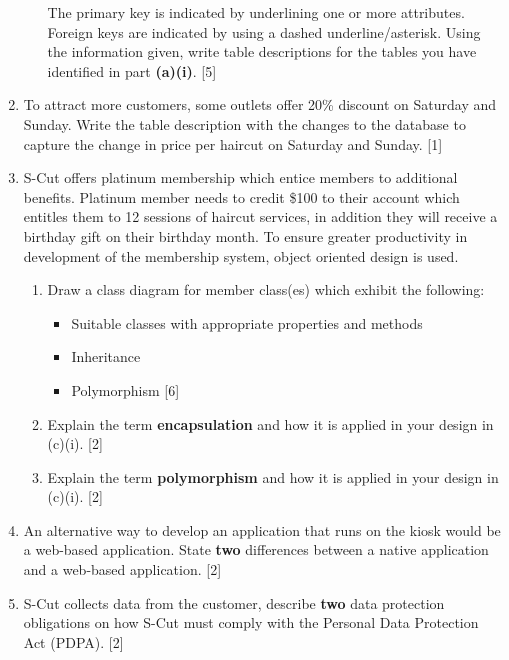 \begin{enumerate}
\begin{enumerate}
The primary key is indicated by underlining one or more attributes.
Foreign keys are indicated by using a dashed underline/asterisk. Using
the information given, write table descriptions for the tables you
have identified in part \textbf{(a)(i)}. \hfill{}{[}5{]}
\end{enumerate}
\item To attract more customers, some outlets offer 20\% discount on Saturday
and Sunday. Write the table description with the changes to the database
to capture the change in price per haircut on Saturday and Sunday.
\hfill{}{[}1{]}
\item S-Cut offers platinum membership which entice members to additional
benefits. Platinum member needs to credit \$100 to their account which
entitles them to 12 sessions of haircut services, in addition they
will receive a birthday gift on their birthday month. To ensure greater
productivity in development of the membership system, object oriented
design is used. 
\begin{enumerate}
\item Draw a class diagram for member class(es) which exhibit the following: 
\begin{itemize}
\item Suitable classes with appropriate properties and methods
\item Inheritance 
\item Polymorphism \hfill{}{[}6{]}
\end{itemize}
\item Explain the term \textbf{encapsulation} and how it is applied in your
design in (c)(i). \hfill{}{[}2{]}
\item Explain the term \textbf{polymorphism} and how it is applied in your
design in (c)(i). \hfill{}{[}2{]}
\end{enumerate}
\item An alternative way to develop an application that runs on the kiosk
would be a web-based application. State \textbf{two} differences between
a native application and a web-based application. \hfill{}{[}2{]}
\item S-Cut collects data from the customer, describe \textbf{two} data
protection obligations on how S-Cut must comply with the Personal
Data Protection Act (PDPA). \hfill{}{[}2{]}
\end{enumerate}